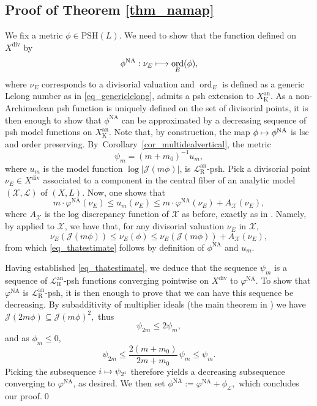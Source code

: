 \documentclass[JEP,XML,SOM,Unicode,NoEqCountersInSection,published]{cedram}
\def\mto{\mathchoice{\longmapsto}{\mapsto}{\mapsto}{\mapsto}}
\theoremstyle{definition}
\newcommand\cJ{\mathcal{J}}
\newcommand\cL{\mathcal{L}}
\newcommand\cX{\mathcal{X}}
\newcommand\K{\mathrm{K}}
\newcommand\R{\mathrm{R}}
\newcommand\mi{^{-1}}
\newcommand\an{^{\mathrm{an}}}
\DeclareMathOperator{\ord}{ord}
\newcommand\PSH{\mathrm{PSH}}
\newcommand\na{^{\mathrm{NA}}}
\begin{document}
\subsection{Proof of Theorem \ref{thm_namap}}\label{subsect_24}
We fix a metric $\phi\in\PSH(L)$. We need to show that the function defined on $X^{\mathrm{div}}$ by\vspace*{-3pt}
\[
\phi\na:\nu_E\mto \ord_E(\phi),
\]
where $\nu_E$ corresponds to a divisorial valuation and $\ord_E$ is defined as a generic Lelong number as in \eqref{eq_genericlelong}, admits a psh extension to $X_\K\an$. As a non-Archimedean psh function is uniquely defined on the set of divisorial points, it is then enough to show that $\phi\na$ can be approximated by a decreasing sequence of psh model functions on $X_\K\an$. Note that, by construction, the map $\phi\mto \phi\na$ is lsc and order preserving. By~Corol\-lary~\ref{cor_multidealvertical}, the metric\vspace*{-3pt}
\[
\psi_m=(m+m_0)\mi u_m,
\]
where $u_m$ is the model function $\log|\cJ(m\phi)|$, is $\cL_\R\an$-psh. Pick a divisorial point $\nu_E\in X^{\mathrm{div}}$ associated to a component in the central fiber of an analytic model $(\cX,\cL)$ of $(X,L)$. Now, one shows that\vspace*{-3pt}
\begin{equation}\label{eq_thatestimate}
m\cdot \varphi\na(\nu_E) \leq u_m(\nu_E) \leq m\cdot \varphi\na(\nu_E) + A_\cX(\nu_E),
\end{equation}
where $A_\cX$ is the log discrepancy function of $\cX$ as before, exactly as in \cite[Lem.\,5.7]{bbj}. Namely, by \cite[Lem.\,B.4]{bbj} applied to $\cX$, we have that, for any divisorial valuation $\nu_E$ in $\cX$,\vspace*{-3pt}
\[
\nu_E(\cJ(m\phi))\leq \nu_E(\phi)\leq \nu_E(\cJ(m\phi))+A_\cX(\nu_E),
\]
from which \eqref{eq_thatestimate} follows by definition of $\phi\na$ and $u_m$.

Having established \eqref{eq_thatestimate}, we deduce that the sequence $\psi_m$ is a sequence of $\cL_\R\an$-psh functions converging pointwise on $X^{\mathrm{div}}$ to $\varphi\na$. To show that $\varphi\na$ is $\cL_\R\an$-psh, it is then enough to prove that we can have this sequence be decreasing. By subadditivity of multiplier ideals (the main theorem in \cite{del}) we have $\cJ(2m\phi)\subseteq \cJ(m\phi)^2,$
thus
\[
\psi_{2m}\leq 2\psi_{m},
\]
and as $\phi_{m}\leq 0$,\vspace*{-3pt}
\[
\psi_{2m}\leq \frac{2(m+m_0)}{2m+m_0}\,\psi_m\leq \psi_m.
\]
Picking the subsequence $i\mto \psi_{2^i}$ therefore yields a decreasing subsequence converging to $\varphi\na$, as desired. We then set
$\phi\na:=\varphi\na + \phi_\cL,$
which concludes our proof.\qed
\end{document}
